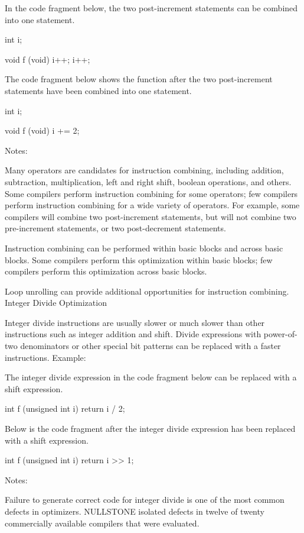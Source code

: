 {{{{{{{{{{In the code fragment below, the two post-increment statements can be combined into one statement.

    int i;

    void f (void)
    {
      i++;
      i++;
    }

The code fragment below shows the function after the two post-increment statements have been combined into one statement.

    int i;

    void f (void)
    {
      i += 2;
    }

Notes:

Many operators are candidates for instruction combining, including addition, subtraction, multiplication, left and right shift, boolean operations, and others. Some compilers perform instruction combining for some operators; few compilers perform instruction combining for a wide variety of operators. For example, some compilers will combine two post-increment statements, but will not combine two pre-increment statements, or two post-decrement statements.

Instruction combining can be performed within basic blocks and across basic blocks. Some compilers perform this optimization within basic blocks; few compilers perform this optimization across basic blocks.

Loop unrolling can provide additional opportunities for instruction combining. 
Integer Divide Optimization

Integer divide instructions are usually slower or much slower than other instructions such as integer addition and shift. Divide expressions with power-of-two denominators or other special bit patterns can be replaced with a faster instructions.
Example:

The integer divide expression in the code fragment below can be replaced with a shift expression.

    int f (unsigned int i)
    {
      return i / 2;
    }

Below is the code fragment after the integer divide expression has been replaced with a shift expression.

    int f (unsigned int i)
    {
      return i >> 1;
    }

Notes:

Failure to generate correct code for integer divide is one of the most common defects in optimizers. NULLSTONE isolated defects in twelve of twenty commercially available compilers that were evaluated.

}}}}}}}}}}
